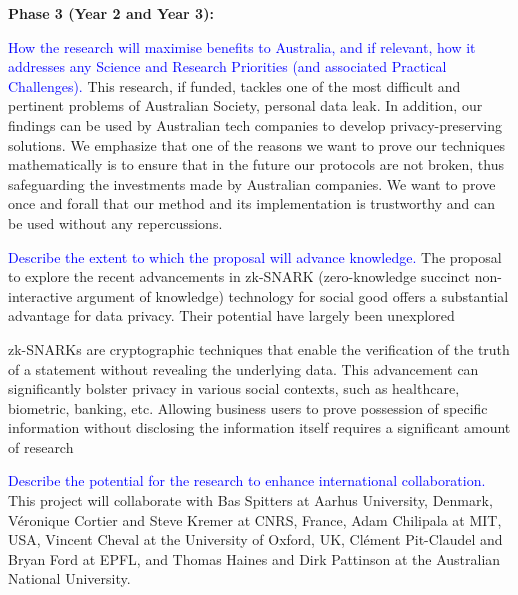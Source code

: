 \documentclass[12pt,a4paper]{article}
\newcommand{\rules}[1]{\textcolor{blue}{#1}}
\begin{document}
\textbf{Phase 3 (Year 2 and Year 3):}













\rules{How the research will maximise benefits to Australia, and if relevant, how it 
addresses any Science and Research Priorities (and associated Practical Challenges).}
This research, if funded, tackles one of the most difficult and pertinent problems  
of Australian Society, personal data leak. In addition, our findings can be used 
by Australian tech companies to develop privacy-preserving solutions. 
We emphasize that one of the reasons we want to prove our techniques mathematically 
is to ensure that in the future our protocols are not broken, 
thus safeguarding the investments made by Australian companies.
We want to prove once and forall that our method and its implementation 
is trustworthy and can be used without any repercussions. 

\rules{Describe the extent to which the proposal will advance knowledge.}
The proposal to explore the recent advancements in zk-SNARK (zero-knowledge succinct non-interactive argument of knowledge) 
technology for social good offers a substantial advantage for data privacy. 
Their potential have largely been unexplored 

zk-SNARKs are cryptographic techniques that enable the verification of the truth of 
a statement without revealing the underlying data. This advancement can significantly 
bolster privacy in various social contexts, such as healthcare, biometric, banking, etc. 
Allowing business users to prove possession of specific information without disclosing 
the information itself requires a significant amount of research 


\rules{Describe the potential for the research to enhance international collaboration.}
This project will collaborate with Bas Spitters at Aarhus University, Denmark, 
Véronique Cortier and Steve Kremer at CNRS, France, Adam Chilipala at MIT, USA, 
Vincent Cheval at the University of Oxford, UK, 
Clément Pit-Claudel and Bryan Ford at EPFL, and Thomas Haines and Dirk 
Pattinson at the Australian National University. 
\end{document}
